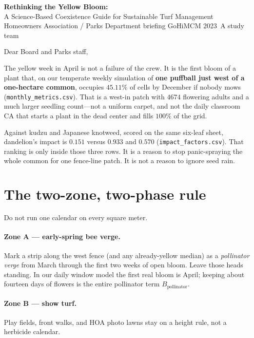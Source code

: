 \documentclass[11pt]{article}
\begin{document}
\begin{center}
{\Large\bfseries Rethinking the Yellow Bloom:}\\[0.25em]
{\large A Science-Based Coexistence Guide for Sustainable Turf Management}\\[0.6em]
{\small Homeowners Association / Parks Department briefing
\quad GoHiMCM 2023~A study team}
\end{center}

\vspace{0.6em}
\noindent
Dear Board and Parks staff,

The yellow week in April is not a failure of the crew.
It is the first bloom of a plant that, on our temperate weekly simulation
of \textbf{one puffball just west of a one-hectare common}, occupies
$\mathbf{45.11\%}$ of cells by December if nobody mows
(\texttt{monthly\_metrics.csv}).
That is a west-in patch with $4674$ flowering adults and a much larger
seedling count---not a uniform carpet, and not the daily classroom CA
that starts a plant in the dead center and fills $100\%$ of the grid.

Against kudzu and Japanese knotweed, scored on the same six-leaf sheet,
dandelion's impact is $0.151$ versus $0.933$ and $0.570$
(\texttt{impact\_factors.csv}).
That ranking is only inside those three rows.
It is a reason to stop panic-spraying the whole common for one fence-line
patch. It is not a reason to ignore seed rain.

\section*{The two-zone, two-phase rule}

Do not run one calendar on every square meter.

\paragraph{Zone A --- early-spring bee verge.}
Mark a strip along the west fence (and any already-yellow median)
as a \emph{pollinator verge} from March through the first two weeks of
open bloom.
Leave those heads standing.
In our daily window model the first real bloom is April;
keeping about fourteen days of flowers is the entire pollinator term
$B_{\mathrm{pollinator}}$.

\paragraph{Zone B --- show turf.}
Play fields, front walks, and HOA photo lawns stay on a height rule,
not a herbicide calendar.
\end{document}
